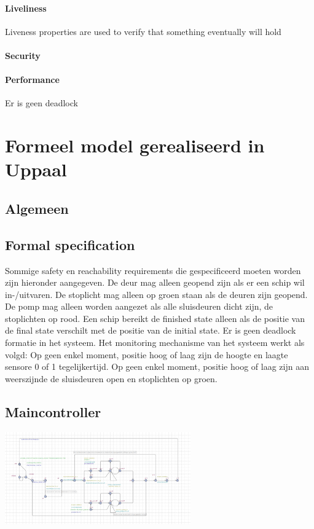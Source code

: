 \documentclass{article}
\begin{document}
	\paragraph{Liveliness}
	Liveness properties are used to verify that
	something eventually will hold
	\paragraph{Security}
	
	\paragraph{Performance}
	
	Er is geen deadlock
	

	
	
	
	\newpage
	\section{Formeel model gerealiseerd in Uppaal}
	
	\subsection{Algemeen}
	
\subsection{Formal specification}
	Sommige safety en reachability requirements die gespecificeerd moeten worden zijn hieronder aangegeven.
	De deur mag alleen  geopend zijn als er een schip wil in-/uitvaren.
	De stoplicht mag alleen op groen staan als de deuren zijn geopend.
	De pomp mag alleen worden aangezet als alle sluisdeuren dicht zijn, de stoplichten op rood.
	Een schip bereikt de finished state alleen als de positie van de final state verschilt met de positie van de initial state.
	Er is geen deadlock formatie in het systeem.
	Het monitoring mechanisme van het systeem werkt als volgd:
	Op geen enkel moment, positie hoog of laag zijn de hoogte en laagte sensore 0 of 1 tegelijkertijd.
	Op geen enkel moment, positie hoog of laag zijn aan weerszijnde de sluisdeuren open en stoplichten op groen.
	
		\subsection{Maincontroller}
	\includegraphics[width=8cm]{main.png} %
\end{document}
